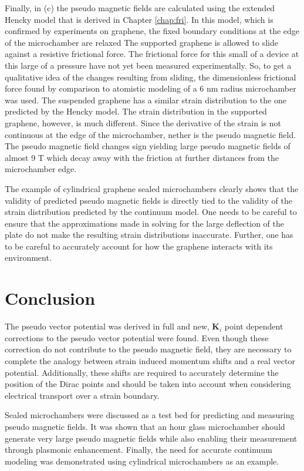 Finally, in (c) the pseudo magnetic fields are calculated using the extended Hencky model that is derived in Chapter \ref{chap:fri}.
In this model, which is confirmed by experiments on graphene, the fixed boundary conditions at the edge of the microchamber are relaxed
The supported graphene is allowed to slide against a resistive frictional force.
The frictional force for this small of a device at this large of a pressure have not yet been measured experimentally.
So, to get a qualitative idea of the changes resulting from sliding, the dimensionless frictional force found by comparison to atomistic modeling of a 6 nm radius microchamber was used.
The suspended graphene has a similar strain distribution to the one predicted by the Hencky model.
The strain distribution in the supported graphene, however, is much different.
Since the derivative of the strain is not continuous at the edge of the microchamber, nether is the pseudo magnetic field.
The pseudo magnetic field changes sign yielding large pseudo magnetic fields of almost 9 T which decay away with the friction at further distances from the microchamber edge.

The example of cylindrical graphene sealed microchambers clearly shows that the validity of predicted pseudo magnetic fields is directly tied to the validity of the strain distribution predicted by the continuum model.
One needs to be careful to ensure that the approximations made in solving for the large deflection of the plate do not make the resulting strain distributions inaccurate.
Further, one has to be careful to accurately account for how the graphene interacts with its environment.

\section{Conclusion}
The pseudo vector potential was derived in full and new, $\bm{K}_i$ point dependent corrections to the pseudo vector potential were found.
Even though these correction do not contribute to the pseudo magnetic field, they are necessary to complete the analogy between strain induced momentum shifts and a real vector potential.
Additionally, these shifts are required to accurately determine the position of the Dirac points and should be taken into account when considering electrical transport over a strain boundary.

Sealed microchambers were discussed as a test bed for predicting and measuring pseudo magnetic fields.
It was shown that an hour glass microchamber should generate very large pseudo magnetic fields while also enabling their measurement through plasmonic enhancement.
Finally, the need for accurate continuum modeling was demonstrated using cylindrical microchambers as an example.